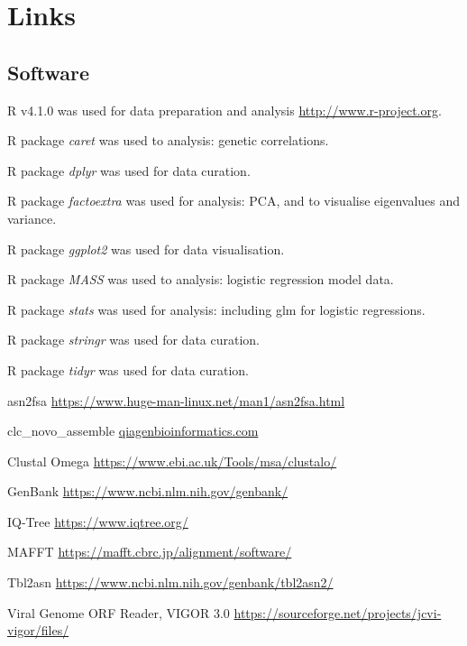 \documentclass{article}
\begin{document}
\section{Links}
\subsection{Software}
\begin{description}[noitemsep]

\item R v4.1.0 was used for data preparation and analysis \url{http://www.r-project.org}.
\item R package \textit{caret} was used to analysis: genetic correlations.
\item R package \textit{dplyr} was used for data curation.
\item R package \textit{factoextra} was used for analysis: PCA, and to visualise eigenvalues and variance.
\item R package \textit{ggplot2} was used for data visualisation.
\item R package \textit{MASS} was used to analysis: logistic regression model data.
\item R package \textit{stats} was used for analysis: including glm for logistic regressions. 
\item R package \textit{stringr} was used for data curation.
\item R package \textit{tidyr} was used for data curation.
\item asn2fsa \url{https://www.huge-man-linux.net/man1/asn2fsa.html}
\item clc\_novo\_assemble \href{https://resources.qiagenbioinformatics.com/manuals
/clcgenomicsworkbench/852/index.php?manual=De_novo_assembly.html}{qiagenbioinformatics.com} \
\item Clustal Omega \url{https://www.ebi.ac.uk/Tools/msa/clustalo/}
\item GenBank \url{https://www.ncbi.nlm.nih.gov/genbank/}
\item IQ-Tree \url{https://www.iqtree.org/}
\item MAFFT \url{https://mafft.cbrc.jp/alignment/software/} \cite{katoh2013mafft}
\item Tbl2asn \url{https://www.ncbi.nlm.nih.gov/genbank/tbl2asn2/}
\item Viral Genome ORF Reader, VIGOR 3.0 \url{https://sourceforge.net/projects/jcvi-vigor/files/}
\end{description}
\end{document}
